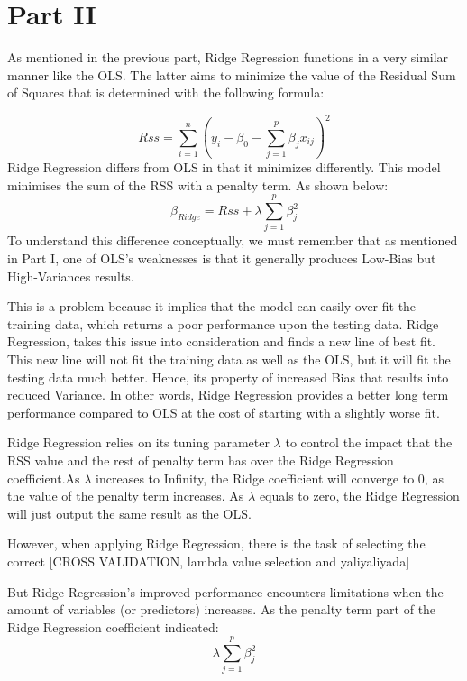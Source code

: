 \documentclass{article}
\begin{document}
\section*{Part II}
As mentioned in the previous part, Ridge Regression functions in a very similar manner like the OLS. The latter aims to minimize the value of the Residual Sum of Squares that is determined with the following formula:

\begin{displaymath}
Rss=\sum_{i=1}^{n}{(y_i-\beta_0-\sum_{j=1}^{p}\beta_jx_{ij})^2}
\end{displaymath}
Ridge Regression differs from OLS in that it minimizes differently. This model minimises the sum of the RSS with a penalty term. As shown below:
\begin{displaymath}
\beta_{Ridge} = Rss + \lambda\sum_{j=1}^{p}\beta_j^2
\end{displaymath}
To understand this difference conceptually, we must remember that as mentioned in Part I, one of OLS's weaknesses is that it generally produces Low-Bias but High-Variances results.

This is a problem because it implies that the model can easily over fit the training data, which returns a poor performance upon the testing data. Ridge Regression, takes this issue into consideration and finds a new line of best fit. This new line will not fit the training data as well as the OLS, but it will fit the testing data much better. Hence, its property of increased Bias that results into reduced Variance. In other words, Ridge Regression provides a better long term performance compared to OLS at the cost of starting with a slightly worse fit.

Ridge Regression relies on its tuning parameter $\lambda$ to control the impact that the RSS value and the rest of penalty term has over the Ridge Regression coefficient.As $\lambda$ increases to Infinity, the Ridge coefficient will converge to 0, as the value of the penalty term increases. As $\lambda$ equals to zero, the Ridge Regression will just output the same result as the OLS.


However, when applying Ridge Regression, there is the task of selecting the correct [CROSS VALIDATION, lambda value selection and yaliyaliyada]

But Ridge Regression's improved performance encounters limitations when the amount of variables (or predictors) increases. As the penalty term part of the Ridge Regression coefficient indicated:
\begin{displaymath}
\lambda\sum_{j=1}^{p}\beta_j^2
\end{displaymath}
\end{document}
